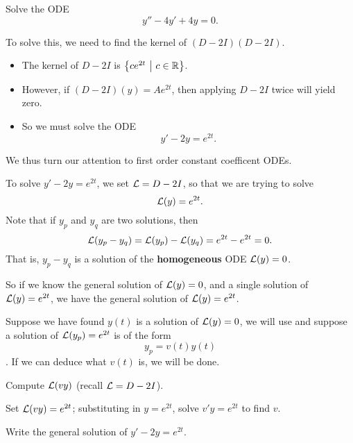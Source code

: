 
\begin{applicationActivities}

\begin{activity}{10}
Solve the ODE \[ y''-4y'+4y=0.\]
\end{activity}

\begin{observation}
To solve this, we need to find the kernel of \( (D-2I)(D-2I) \).
\begin{itemize}
\item The kernel of \(D-2I\) is \(\left\{ ce^{2t}\ \middle|\ c \in \mathbb{R} \right\}\).
\item However, if \( (D-2I)(y) = Ae^{2t} \), then applying \(D-2I\) twice will yield zero.
\item So we must solve the ODE \[y'-2y=e^{2t}.\]
\end{itemize}

We thus turn our attention to  first order constant coefficent ODEs.
\end{observation}


\begin{observation}
To solve \(y'-2y=e^{2t}\), we set \(\mathcal{L}=D-2I\), so that we are trying to solve \[\mathcal{L}(y)=e^{2t}.\]  
Note that if \(y_p\) and \(y_q\) are two solutions, then \[\mathcal{L}(y_p-y_q)=\mathcal{L}(y_p)-\mathcal{L}(y_q)=e^{2t}-e^{2t}=0.\]
That is, \(y_p-y_q\) is a solution of the \textbf{homogeneous} ODE \(\mathcal{L}(y)=0\).

So if we know the general solution of \(\mathcal{L}(y)=0\), and a single solution of \(\mathcal{L}(y)=e^{2t}\), we have the general solution of \(\mathcal{L}(y)=e^{2t}\).
\end{observation}

\begin{activity}{15}
Suppose we have found  \(y(t)\) is a solution of \(\mathcal{L}(y)=0\), we will use  and suppose a solution of \(\mathcal{L}(y_p)=e^{2t}\) is of the form \[y_p =v(t) y(t)\].  If we can deduce what \(v(t)\) is, we will be done.
\begin{subactivity}
Compute \(\mathcal{L}(vy)\) (recall \(\mathcal{L}=D-2I\)).
\end{subactivity}
\begin{subactivity}
Set \(\mathcal{L}(vy)=e^{2t}\); substituting in \(y=e^{2t}\), solve \(v'y=e^{2t}\) to find \(v\).  
\end{subactivity}
\begin{subactivity}
Write the general solution of \(y'-2y=e^{2t}\).
\end{subactivity}
\end{activity}


\end{applicationActivities}
